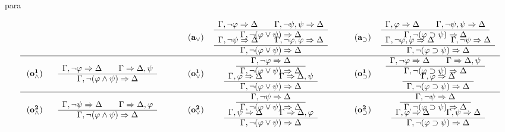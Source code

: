 \begin{entry}{para}
\begin{calculus}
\[\begin{tabular}{ccc@{\hspace{2em}}ccc@{\hspace{2em}}cc}
\vspace{-1.5em}
    & &&  &  $\drul{,\neg\vfi}{}{,\neg\psi,\psi}{}{,\neg     (\vfi\vee\psi)}{}$ && &  $\drul{,\vfi}{}{,\neg\psi,\psi}{}{,\neg    (\vfi\su\psi)}{}$ \ \  \\
\vspace{-1.5em}
\phantom{${\name{a_\wedge}}$ }
  &
  \phantom{$\drul{,\neg \vfi}{}{,\neg\psi}{}{,\neg  (\vfi\w\psi)}{}$ }
  &&
 ${\name{a_\vee}}$ & &&   ${\name{a_\su}}$  & \ \ \\
  &&&&  $\drul{,\neg\psi}{}{,\neg\vfi,\vfi}{}{,\neg(\vfi\vee\psi)}{}$ &&   &    $\drul{,\neg\vfi,\vfi}{}{,\neg\psi}{}{,\neg      (\vfi\su\psi)}{}$ \\\hline

\vspace{-1.5em}
&&&&   $\srul{,\neg \vfi}{}{,\neg (\vfi\vee\psi)}{}$   &&& $\drul{,\neg \vfi}{}{}{,\psi}{,\neg (\vfi\su\psi)}{}$  \ \ \\
\vspace{-1.5em}
 ${\name{o^{1}_\w}}$ &  $\drul{,\neg \vfi}{}{}{,\psi}{,\neg (\vfi\w\psi)}{}$ &&
 ${\name{o^{1}_\vee}}$ &&& ${\name{o^{1}_\su}}$ & \ \ \\
 &&&&  $\drul{,\vfi}{}{}{,\psi}{,\neg (\vfi\vee\psi)}{}$ &&&
 $\srul{,\vfi}{}{,\neg (\vfi\su\psi)}{}$ \\\hline



\vspace{-1.5em}
&&&& $\srul{,\neg \psi}{}{,\neg (\vfi\vee\psi)}{}$ &&&   $\srul{,\neg \psi}{}{,\neg (\vfi\su\psi)}{}$ \ \ \\
\vspace{-1.5em}
 ${\name{o^{2}_\w}}$ &  $\drul{,\neg \psi}{}{}{,\vfi}{,\neg (\vfi\w\psi)}{}$ &&
 ${\name{o^{2}_\vee}}$ &&&
 ${\name{o^{2}_\su}}$ & \ \ \\
 &&&& $\drul{,\psi}{}{}{,\vfi}{,\neg (\vfi\vee\psi)}{}$ &&&$\drul{,\vfi}{}{,\psi}{}{,\neg (\vfi\su\psi)}{}$%



 \end{tabular}\]
\normalsize
\end{calculus}



\end{entry}
